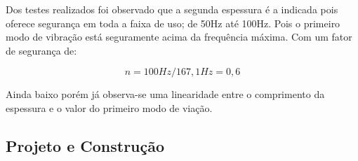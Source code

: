 Dos testes realizados foi observado que a segunda espessura é a indicada pois oferece segurança em toda a faixa de uso; de 50Hz até 100Hz.
Pois o primeiro modo de vibração está seguramente acima da frequência máxima. Com um fator de segurança de:

    \begin{equation}
            n = 100 Hz/167,1 Hz = 0,6
    \end{equation}

Ainda baixo porém já observa-se uma linearidade entre o comprimento da espessura e o valor do primeiro modo de viação.

\subsection{Projeto e Construção}

